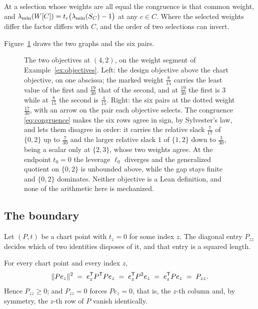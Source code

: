 At a selection whose weights are all equal the congruence is that common
weight, and $\lambda_{\min}(W[C])=t_c\bigl(\lambda_{\min}(S_{C})-1\bigr)$ at any $c\in C$.
Where the selected weights differ the factor differs with $C$, and the
order of two selections can invert.


Figure~\ref{fig:objectives} draws the two graphs and the six pairs.

\begin{figure}[ht]
  \centering
  
  \caption{The two objectives at $(4,2)$, on the weight segment of
  Example~\ref{ex:objectives}.  Left: the design objective above the
  chart objective, on one abscissa; the marked weight $\tfrac8{15}$
  carries the least value of the first and $\tfrac{19}{30}$ that of the
  second, and at $\tfrac{19}{30}$ the first is $3$ while at $\tfrac8{15}$
  the second is $\tfrac4{15}$.  Right: the six pairs at the dotted weight
  $\tfrac{17}{30}$, with an arrow on the pair each objective selects.
  The congruence \eqref{eq:congruence} makes the six rows agree in sign,
  by Sylvester's law, and lets them disagree in order: it carries the
  relative slack $\tfrac7{17}$ of $\{0,2\}$ up to $\tfrac7{30}$ and the
  larger relative slack $1$ of $\{1,2\}$ down to $\tfrac3{30}$, being
  a scalar only at $\{2,3\}$, whose two weights agree.  At the endpoint
  $t_0=0$ the leverage $\ell_0$ diverges and the generalized quotient on
  $\{0,2\}$ is unbounded above, while the gap stays finite and $\{0,2\}$
  dominates.  Neither
  objective is a Lean definition, and none of the arithmetic here is
  mechanized.}
  \label{fig:objectives}
\end{figure}

\subsection{The boundary}\label{sec:boundary}

Let $(P,t)$ be a chart point with $t_z=0$ for some index $z$.  The
diagonal entry $P_{zz}$ decides which of two identities disposes of it,
and that entry is a squared length.

\begin{lemma}[Lean]\label{lem:pivot}
For every chart point and every index $z$,
\begin{equation}\label{eq:pivot}
  \lVert Pe_z\rVert^{2}\;=\;e_z^{\mathsf{T}} P^{\mathsf{T}} Pe_z\;=\;e_z^{\mathsf{T}} P^{2}e_z
  \;=\;e_z^{\mathsf{T}} Pe_z\;=\;P_{zz} .
\end{equation}
Hence $P_{zz}\ge0$; and $P_{zz}=0$ forces $Pe_z=0$, that is, the $z$-th
column and, by symmetry, the $z$-th row of $P$ vanish identically.
\end{lemma}

